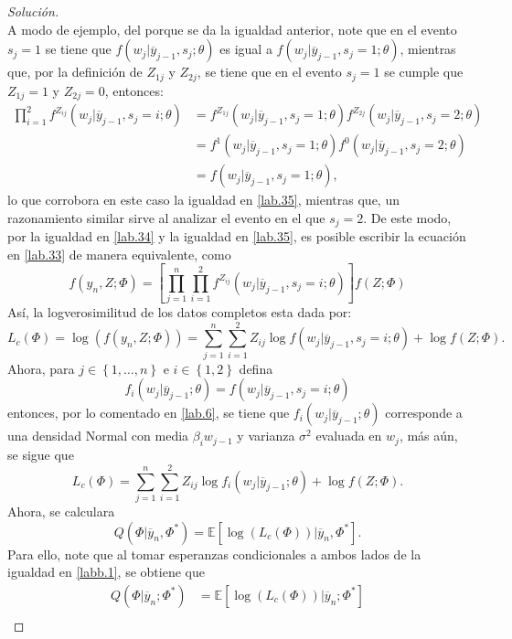 \documentclass[10.5pt,notitlepage]{article}
\newenvironment{solucion}
  {\begin{proof}[Solución]}
  {\end{proof}}
\newcommand{\EE}{\mathbb{E}}
\newcommand{\corch}[1]{\left[ #1 \right]}
\newcommand{\kis}[1]{\left\{ #1 \right\}}
\theoremstyle{plain}
\begin{document}
\begin{solucion}
\begin{equation}
\end{equation}
A modo de ejemplo, del porque se da la igualdad anterior, note que en el evento \(s_j = 1\) se tiene que \(f(w_{j} | \overline{y}_{j-1}, s_{j};\theta)\) es igual a 
\(f(w_{j} | \overline{y}_{j-1}, s_{j} = 1;\theta)\), mientras que, por la definición de \(Z_{1j}\) y \(Z_{2j}\), se tiene que en el evento \(s_{j} = 1\) se cumple que \(Z_{1j} = 1\) y \(Z_{2j} = 0\), entonces:
\begin{align*}
   \prod_{i = 1}^{2}f^{Z_{ij}}(w_{j} | \overline{y}_{j-1}, s_{j} = i;\theta) &= f^{Z_{1j}}(w_{j} | \overline{y}_{j-1}, s_{j} = 1;\theta)f^{Z_{2j}}(w_{j} | \overline{y}_{j-1}, s_{j} = 2;\theta) \\
   &= f^{1}(w_{j} | \overline{y}_{j-1}, s_{j} = 1;\theta)f^{0}(w_{j} | \overline{y}_{j-1}, s_{j} = 2;\theta)\\ 
    &= f(w_{j} | \overline{y}_{j-1}, s_{j} = 1;\theta), 
\end{align*}
lo que corrobora en este caso la igualdad en \eqref{lab.35}, mientras que, un razonamiento similar sirve al analizar el evento en el que \(s_{j} = 2\). De este modo, por la igualdad en \eqref{lab.34} y la igualdad en \eqref{lab.35}, es posible escribir la ecuación en \eqref{lab.33} de manera equivalente, como
\[
 f(y_n,Z;\Phi) =  \corch{\prod_{j = 1}^{n}\prod_{i = 1}^{2}f^{Z_{ij}}(w_{j} | \overline{y}_{j-1}, s_{j} = i;\theta)}f(Z; \Phi)
\]
Así, la logverosimilitud de los datos completos esta dada por:
\[
L_{c}(\Phi) = \log(f(y_n,Z;\Phi)) = \sum_{j = 1}^{n}\sum_{i = 1}^{2}Z_{ij}\log f(w_{j} | \overline{y}_{j-1}, s_{j} = i;\theta) + \log f(Z ; \Phi).
\]
Ahora, para \(j \in \kis{1,\hdots,n}\) e \(i \in \kis{1,2}\) defina
\[f_{i}(w_{j}| \overline{y}_{j-1} ; \theta)=f(w_{j} | \overline{y}_{j-1}, s_{j} = i;\theta)\]
entonces, por lo comentado en \eqref{lab.6}, se tiene que \(f_{i}(w_{j}| \overline{y}_{j-1} ; \theta)\) corresponde a una densidad Normal con media \(\beta_{i} w_{j-1}\) y varianza \(\sigma^2\) evaluada en \(w_j\), más aún, se sigue que 
\begin{equation}\label{labb.1}
L_{c}(\Phi) =  \sum_{j = 1}^{n}\sum_{i = 1}^{2}Z_{ij}\log f_{i}(w_{j} | \overline{y}_{j-1};\theta) + \log f(Z ; \Phi).    
\end{equation}
Ahora, se calculara  
\[
Q(\Phi| \overline{y}_{n}, \Phi^{*}) = \EE[ \log(L_{c}(\Phi))|\overline{y}_{n}, \Phi^{*}].
\]
Para ello, note que al tomar esperanzas condicionales a ambos lados de la igualdad en \eqref{labb.1}, se obtiene que 
\begin{align*}
    Q(\Phi| \overline{y}_{n}; \Phi^{*}) &= \EE[ \log(L_{c}(\Phi))|\overline{y}_{n};\Phi^{*}]\nonumber\\  

\end{align*}
\end{solucion}
\end{document}
